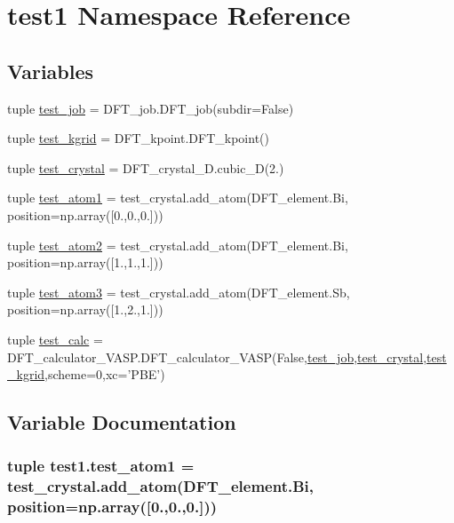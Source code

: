 \hypertarget{namespacetest1}{\section{test1 Namespace Reference}
\label{namespacetest1}
}
\subsection*{Variables}
\begin{DoxyCompactItemize}
\item 
tuple \hyperlink{namespacetest1_aa1e1b8819257d38e312705aea54b74f0}{test\+\_\+job} = D\+F\+T\+\_\+job.\+D\+F\+T\+\_\+job(subdir=False)
\item 
tuple \hyperlink{namespacetest1_a53b8fef5f47cd9bf5328eeb3c19dfb48}{test\+\_\+kgrid} = D\+F\+T\+\_\+kpoint.\+D\+F\+T\+\_\+kpoint()
\item 
tuple \hyperlink{namespacetest1_a50fd026a5228d16663c95a2d68f4ea82}{test\+\_\+crystal} = D\+F\+T\+\_\+crystal\+\_\+D.\+cubic\+\_\+D(2.)
\item 
tuple \hyperlink{namespacetest1_a99726b12e07f87ac8a8817826e3f8ea3}{test\+\_\+atom1} = test\+\_\+crystal.\+add\+\_\+atom(D\+F\+T\+\_\+element.\+Bi, position=np.\+array(\mbox{[}0.,0.,0.\mbox{]}))
\item 
tuple \hyperlink{namespacetest1_a8497562cdeb1db7074c872cc5e2b1868}{test\+\_\+atom2} = test\+\_\+crystal.\+add\+\_\+atom(D\+F\+T\+\_\+element.\+Bi, position=np.\+array(\mbox{[}1.,1.,1.\mbox{]}))
\item 
tuple \hyperlink{namespacetest1_ab569ecccdcd6abf89fa3ba8a36e352d0}{test\+\_\+atom3} = test\+\_\+crystal.\+add\+\_\+atom(D\+F\+T\+\_\+element.\+Sb, position=np.\+array(\mbox{[}1.,2.,1.\mbox{]}))
\item 
tuple \hyperlink{namespacetest1_a87415327a2d33f0c12dd9e2b746a94d0}{test\+\_\+calc} = D\+F\+T\+\_\+calculator\+\_\+\+V\+A\+S\+P.\+D\+F\+T\+\_\+calculator\+\_\+\+V\+A\+S\+P(False,\hyperlink{namespacetest1_aa1e1b8819257d38e312705aea54b74f0}{test\+\_\+job},\hyperlink{namespacetest1_a50fd026a5228d16663c95a2d68f4ea82}{test\+\_\+crystal},\hyperlink{namespacetest1_a53b8fef5f47cd9bf5328eeb3c19dfb48}{test\+\_\+kgrid},scheme=0,xc='P\+B\+E')
\end{DoxyCompactItemize}


\subsection{Variable Documentation}
\hypertarget{namespacetest1_a99726b12e07f87ac8a8817826e3f8ea3}{
\subsubsection[{test\+\_\+atom1}]{\setlength{\rightskip}{0pt plus 5cm}tuple test1.\+test\+\_\+atom1 = test\+\_\+crystal.\+add\+\_\+atom(D\+F\+T\+\_\+element.\+Bi, position=np.\+array(\mbox{[}0.,0.,0.\mbox{]}))}}\label{namespacetest1_a99726b12e07f87ac8a8817826e3f8ea3}


